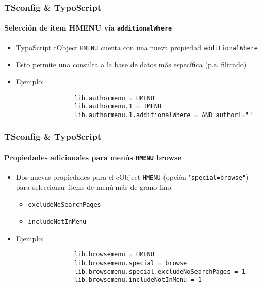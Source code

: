 \begin{frame}[fragile]
	\frametitle{TSconfig \& TypoScript}
	\framesubtitle{Selección de item HMENU vía \texttt{additionalWhere}}

	\begin{itemize}

		\item TypoScript cObject \texttt{HMENU} cuenta con una nueva propiedad \texttt{additionalWhere}
		\item Esto permite una consulta a la base de datos más específica (p.e. filtrado)

		\item Ejemplo:

			\begin{lstlisting}
				lib.authormenu = HMENU
				lib.authormenu.1 = TMENU
				lib.authormenu.1.additionalWhere = AND author!=""
			\end{lstlisting}

	\end{itemize}

\end{frame}


\begin{frame}[fragile]
	\frametitle{TSconfig \& TypoScript}
	\framesubtitle{Propiedades adicionales para menús \texttt{HMENU} browse}

	\begin{itemize}
		\item Dos nuevas propiedades para el cObject \texttt{HMENU} (opción "\texttt{special=browse"})\newline
			para seleccionar ítems de menú más de grano fino:
		
			\begin{itemize}
				\item \texttt{excludeNoSearchPages}
				\item \texttt{includeNotInMenu}
			\end{itemize}

		\item Ejemplo:

			\begin{lstlisting}
				lib.browsemenu = HMENU
				lib.browsemenu.special = browse
				lib.browsemenu.special.excludeNoSearchPages = 1
				lib.browsemenu.includeNotInMenu = 1
			\end{lstlisting}

	\end{itemize}

\end{frame}

